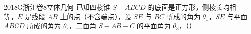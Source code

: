 
\begin{problem}{2018}{G}{浙江卷}{8}{立体几何}
已知四棱锥 $ S-ABCD $ 的底面是正方形，侧棱长均相等，$ E $ 是线段 $ AB $ 上的点（不含端点），设 $ SE $ 与 $ BC $ 所成的角为 $ \theta_1 $，$ SE $ 与平面 $ ABCD $ 所成的角为 $ \theta_2 $，二面角 $ S-AB-C $ 的平面角为 $ \theta_3 $，（\hspace{1cm}）
\begin{choices}
\end{choices}
\end{problem}

\begin{answer}

\end{answer}

\begin{solutions}

\end{solutions}